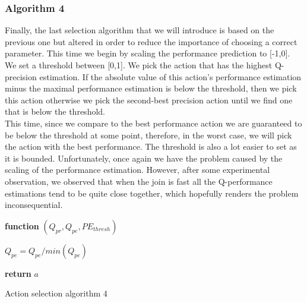 \subsubsection{Algorithm 4}
Finally, the last selection algorithm that we will introduce is based on the previous one but altered in order to reduce the importance of choosing a correct parameter. This time we begin by scaling the performance prediction to [-1,0]. We set a threshold between [0,1]. We pick the action that has the highest Q-precision estimation. If the absolute value of this action's performance estimation minus the maximal performance estimation is below the threshold, then we pick this action otherwise we pick the second-best precision action until we find one that is below the threshold.\\
This time, since we compare to the best performance action we are guaranteed to be below the threshold at some point, therefore, in the worst case, we will pick the action with the best performance. The threshold is also a lot easier to set as it is bounded. Unfortunately, once again we have the problem caused by the scaling of the performance estimation. However, after some experimental observation, we observed that when the join is fast all the Q-performance estimations tend to be quite close together, which hopefully renders the problem inconsequential. 
\begin{center}
	\begin{algorithm}[H]

    \textbf{function}  $(Q_{pr},Q_{pe},PE_{thresh})$\;
    
    
    \Indp{}\Indm
    \Indp{} \Indm
    \Indp
    $Q_{pe} = Q_{pe}/min(Q_{pe})$\\
   
  
   \textbf{return} $a$
   
    
\caption{Action selection algorithm 4}
\end{algorithm}
\end{center}
